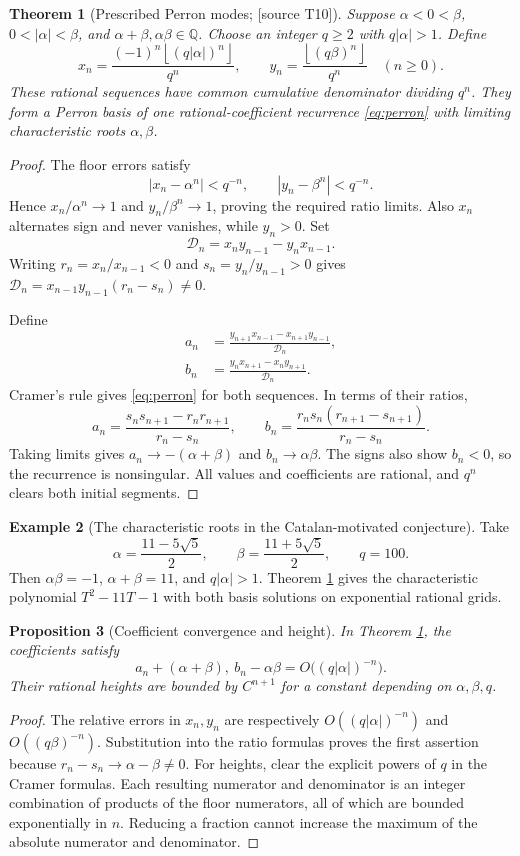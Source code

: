 \documentclass[11pt,a4paper]{article}
\newtheorem{theorem}{Theorem}[section]
\newtheorem{proposition}[theorem]{Proposition}
\theoremstyle{definition}\newtheorem{definition}[theorem]{Definition}
\newtheorem{example}[theorem]{Example}
\theoremstyle{remark}\newtheorem{remark}[theorem]{Remark}
\newcommand{\Q}{\mathbb Q}\newcommand{\Z}{\mathbb Z}\newcommand{\N}{\mathbb N}\newcommand{\R}{\mathbb R}\newcommand{\C}{\mathbb C}
\newcommand{\floor}[1]{\left\lfloor #1\right\rfloor}\newcommand{\ceil}[1]{\left\lceil #1\right\rceil}
\newcommand{\sourceT}[1]{\textup{[source T#1]}}
\begin{document}
\begin{theorem}[Prescribed Perron modes; \sourceT{10}]\label{thm:floor}
Suppose $\alpha<0<\beta$, $0<|\alpha|<\beta$, and $\alpha+\beta,\alpha\beta\in\Q$. Choose an integer $q\ge2$ with $q|\alpha|>1$. Define
\[
 x_n=\frac{(-1)^n\floor{(q|\alpha|)^n}}{q^n},\qquad
 y_n=\frac{\floor{(q\beta)^n}}{q^n}\quad(n\ge0).
\]
These rational sequences have common cumulative denominator dividing $q^n$. They form a Perron basis of one rational-coefficient recurrence \eqref{eq:perron} with limiting characteristic roots $\alpha,\beta$.
\end{theorem}
\begin{proof}
The floor errors satisfy
\[
 |x_n-\alpha^n|<q^{-n},\qquad |y_n-\beta^n|<q^{-n}.
\]
Hence $x_n/\alpha^n\to1$ and $y_n/\beta^n\to1$, proving the required ratio limits. Also $x_n$ alternates sign and never vanishes, while $y_n>0$. Set
\[
 \mathcal D_n=x_ny_{n-1}-y_nx_{n-1}.
\]
Writing $r_n=x_n/x_{n-1}<0$ and $s_n=y_n/y_{n-1}>0$ gives
$\mathcal D_n=x_{n-1}y_{n-1}(r_n-s_n)\ne0$.

Define
\begin{align*}
 a_n&=\frac{y_{n+1}x_{n-1}-x_{n+1}y_{n-1}}{\mathcal D_n},\\
 b_n&=\frac{y_nx_{n+1}-x_ny_{n+1}}{\mathcal D_n}.
\end{align*}
Cramer's rule gives \eqref{eq:perron} for both sequences. In terms of their ratios,
\[
 a_n=\frac{s_ns_{n+1}-r_nr_{n+1}}{r_n-s_n},\qquad
 b_n=\frac{r_ns_n(r_{n+1}-s_{n+1})}{r_n-s_n}.
\]
Taking limits gives $a_n\to-(\alpha+\beta)$ and $b_n\to\alpha\beta$. The signs also show $b_n<0$, so the recurrence is nonsingular. All values and coefficients are rational, and $q^n$ clears both initial segments.
\end{proof}

\begin{example}[The characteristic roots in the Catalan-motivated conjecture]
Take
\[
 \alpha=\frac{11-5\sqrt5}{2},\qquad
 \beta=\frac{11+5\sqrt5}{2},\qquad q=100.
\]
Then $\alpha\beta=-1$, $\alpha+\beta=11$, and $q|\alpha|>1$. Theorem \ref{thm:floor} gives the characteristic polynomial $T^2-11T-1$ with both basis solutions on exponential rational grids.
\end{example}

\begin{proposition}[Coefficient convergence and height]
In Theorem \ref{thm:floor}, the coefficients satisfy
\[
 a_n+(\alpha+\beta),\ b_n-\alpha\beta
 =O\bigl((q|\alpha|)^{-n}\bigr).
\]
Their rational heights are bounded by $C^{n+1}$ for a constant depending on $\alpha,\beta,q$.
\end{proposition}
\begin{proof}
The relative errors in $x_n,y_n$ are respectively $O((q|\alpha|)^{-n})$ and $O((q\beta)^{-n})$. Substitution into the ratio formulas proves the first assertion because $r_n-s_n\to\alpha-\beta\ne0$. For heights, clear the explicit powers of $q$ in the Cramer formulas. Each resulting numerator and denominator is an integer combination of products of the floor numerators, all of which are bounded exponentially in $n$. Reducing a fraction cannot increase the maximum of the absolute numerator and denominator.
\end{proof}
\end{document}

